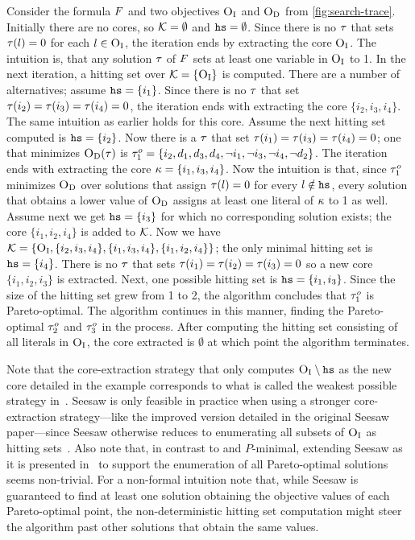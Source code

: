 \begin{example}
  Consider the formula $F$ and two objectives $\textsc{O}_{\text{I}}$ and $\textsc{O}_{\text{D}}$ from \cref{fig:search-trace}. 
  Initially there are no cores, so $\mathcal{K} = \emptyset$ and $\texttt{hs} = \emptyset$.
  Since there is no $\tau$ that sets $\tau(l) = 0$ for each $l \in \textsc{O}_{\text{I}}$, the iteration ends by extracting the core $\textsc{O}_{\text{I}}$. 
  The intuition is, that any solution $\tau$ of $F$ sets at least one variable in $\textsc{O}_{\text{I}}$ to 1.
  In the next iteration, a hitting set over $\mathcal{K} = \{ \textsc{O}_{\text{I}} \}$ is computed.
  There are a number of alternatives;
  assume $\texttt{hs} = \{ i_1 \}$.
  Since there is no $\tau$ that set $\tau(i_2) = \tau(i_3) = \tau(i_4) = 0$, the iteration ends with extracting the core $\{ i_2, i_3, i_4\}$.
  The same intuition as earlier holds for this core.
  Assume the next hitting set computed is $\texttt{hs} = \{i_2\}$.
  Now there is a $\tau$ that set $\tau(i_1) = \tau(i_3) = \tau(i_4) = 0$;
  one that minimizes $\textsc{O}_{\text{D}}(\tau)$ is $\tau^o_1 = \{i_2,\allowbreak d_1,\allowbreak d_3,\allowbreak d_4,\allowbreak \lnot i_1,\allowbreak \lnot i_3,\allowbreak \lnot i_4,\allowbreak \lnot d_2\}$.
  The iteration ends with extracting the core $\kappa = \{i_1, i_3, i_4\}$.
  Now the intuition is that, since $\tau^o_1$ minimizes $\textsc{O}_{\text{D}}$ over solutions that assign $\tau(l) = 0$ for every $l \notin \texttt{hs}$, every solution that obtains a lower value of $\textsc{O}_{\text{D}}$ assigns at least one literal of $\kappa$ to 1 as well. 
  Assume next we get $\texttt{hs} = \{i_3\}$ for which no corresponding solution exists;
  the core $\{i_1, i_2, i_4\}$ is added to $\mathcal{K}$.
  Now we have $\mathcal{K} = \{ \textsc{O}_{\text{I}}, \{i_2, i_3, i_4\}, \{i_1, i_3, i_4\}, \{i_1, i_2, i_4\}\}$;
  the only minimal hitting set is $\texttt{hs} = \{ i_4 \}$.
  There is no $\tau$ that sets $\tau(i_1) = \tau(i_2) = \tau(i_3) = 0$ so a new core $\{i_1, i_2, i_3\}$ is extracted. 
  Next, one possible hitting set is $\texttt{hs} = \{i_1, i_3\}$.
  Since the size of the hitting set grew from 1 to 2, the algorithm concludes that $\tau^o_1$ is Pareto-optimal. 
  The algorithm continues in this manner, finding the Pareto-optimal $\tau^o_2$ and $\tau^o_3$ in the process.
  After computing the hitting set consisting of all literals in $\textsc{O}_{\text{I}}$, the core extracted is $\emptyset$ at which point the algorithm terminates. 
\end{example}

Note that the core-extraction strategy that only computes $\textsc{O}_{\text{I}} \setminus \texttt{hs}$ as the new core detailed in the example corresponds to what is called the weakest possible strategy in~\textcite{DBLP:conf/cp/JanotaMSM21}.
Seesaw is only feasible in practice when using a stronger core-extraction strategy---like the improved version detailed in the original Seesaw paper---since Seesaw otherwise reduces to enumerating all subsets of $\textsc{O}_{\text{I}}$ as hitting sets~\autocite{DBLP:conf/cp/JanotaMSM21}.
Also note that, in contrast to \algname{} and $P$-minimal, extending Seesaw as it is presented in~\textcite{DBLP:conf/cp/JanotaMSM21} to support the enumeration of all Pareto-optimal solutions seems non-trivial.
For a non-formal intuition note that, while Seesaw is guaranteed to find at least one solution obtaining the objective values of each Pareto-optimal point, the non-deterministic hitting set computation might steer the algorithm past other solutions that obtain the same values.

